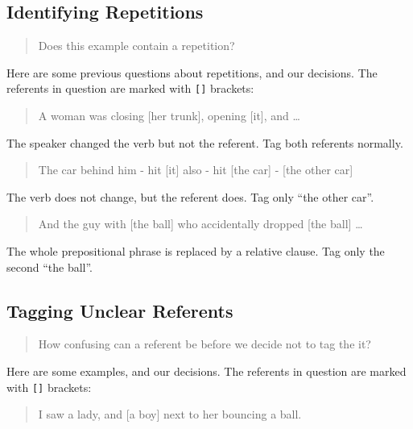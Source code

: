 \documentclass[
]{book}
\begin{document}
\hypertarget{identifying-repetitions}{%
\subsection{Identifying Repetitions}\label{identifying-repetitions}}

\begin{quote}
Does this example contain a repetition?
\end{quote}

Here are some previous questions about repetitions, and our decisions.
The referents in question are marked with \texttt{{[}{]}} brackets:

\begin{quote}
A woman was closing {[}her trunk{]}, opening {[}it{]}, and \ldots{}
\end{quote}

The speaker changed the verb but not the referent.
Tag both referents normally.

\begin{quote}
The car behind him - hit {[}it{]} also - hit {[}the car{]} - {[}the other car{]}
\end{quote}

The verb does not change, but the referent does.
Tag only ``the other car''.

\begin{quote}
And the guy with {[}the ball{]} who accidentally dropped {[}the ball{]} \ldots{}
\end{quote}

The whole prepositional phrase is replaced by a relative clause.
Tag only the second ``the ball''.

\hypertarget{tagging-unclear-referents}{%
\subsection{Tagging Unclear Referents}\label{tagging-unclear-referents}}

\begin{quote}
How confusing can a referent be before we decide not to tag the it?
\end{quote}

Here are some examples, and our decisions.
The referents in question are marked with \texttt{{[}{]}} brackets:

\begin{quote}
I saw a lady, and {[}a boy{]} next to her bouncing a ball.
\end{quote}
\end{document}

